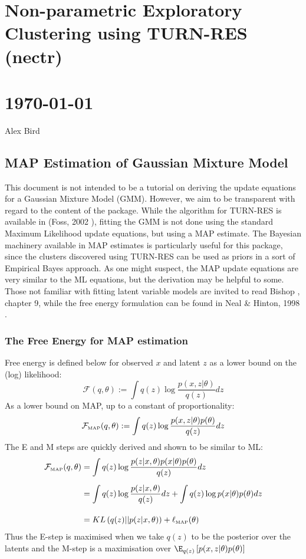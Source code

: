 \documentclass[11pt]{article}
\begin{document}
\section*{Non-parametric Exploratory Clustering using TURN-RES (nectr)}
\section*{\today}
\hspace*{\fill}Alex Bird\hspace*{\fill}
\vspace*{20pt}

\subsection{MAP Estimation of Gaussian Mixture Model}
This document is not intended to be a tutorial on deriving the update equations for a Gaussian Mixture Model (GMM). However, we aim to be transparent with regard to the content of the package. While the algorithm for TURN-RES is available in (Foss, 2002 \cite{F02}), fitting the GMM is not done using the standard Maximum Likelihood update equations, but using a MAP estimate. The Bayesian machinery available in MAP estimates is particularly useful for this package, since the clusters discovered using TURN-RES can be used as priors in a sort of Empirical Bayes approach. As one might suspect, the MAP update equations are very similar to the ML equations, but the derivation may be helpful to some. Those not familiar with fitting latent variable models are invited to read Bishop \cite{B06}, chapter 9, while the free energy formulation can be found in Neal \& Hinton, 1998 \cite{N98}.

\subsubsection{The Free Energy for MAP estimation}
Free energy is defined below for observed $x$ and latent $z$ as a lower bound on the (log) likelihood:
$$ \mathcal{F}(q, \theta) := \int q(z) \log \frac{p(x, z|\theta)}{q(z)}dz $$
As a lower bound on MAP, up to a constant of proportionality:
$$ \mathcal{F}_{\text{\tiny{MAP}}}(q, \theta) := \int q(z) \log \frac{p(x, z|\theta) p(\theta)}{q(z)}dz $$
The E and M steps are quickly derived and shown to be similar to ML:
\begin{align*}
\mathcal{F}_{\text{\tiny{MAP}}}(q, \theta) &=  \int q(z) \log \frac{p(z| x, \theta) p(x |\theta) p(\theta)}{q(z)}dz\\[5pt]
&=  \int q(z) \log \frac{p(z| x, \theta)}{q(z)}dz + \int q(z) \log p(x |\theta) p(\theta) dz \\[10pt]
&=  KL\left(q(z)||p(z|x,\theta)\right) + \ell_{\text{\tiny{MAP}}}(\theta)
\end{align*}
Thus the E-step is maximised when we take $q(z)$ to be the posterior over the latents and the M-step is a maximisation over $\E_{q(z)} \left[p(x, z|\theta) p(\theta)\right]$
\\[20pt]
\end{document}
